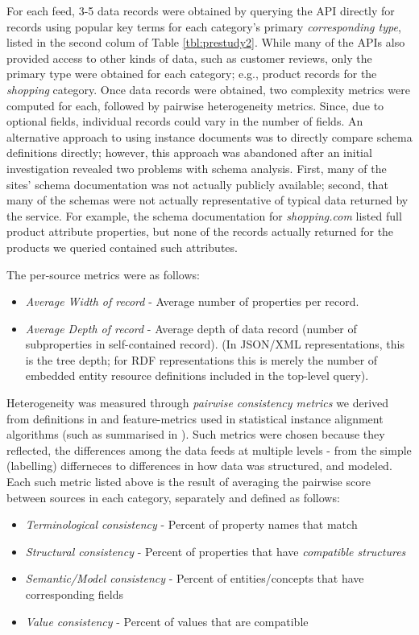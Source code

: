 \documentclass{sigchi}
\begin{document}
For each feed, 3-5 data records were obtained by querying the API directly for records using popular key terms for each category's primary \emph{corresponding type}, listed in the second colum of Table \ref{tbl:prestudy2}. While many of the APIs also provided access to other kinds of data, such as customer reviews, only the primary type were obtained for each category; e.g., product records for the \emph{shopping} category.  Once data records were obtained, two complexity metrics were computed for each, followed by pairwise heterogeneity metrics.  Since, due to optional fields,  individual records could vary in the number of fields.  An alternative approach to using instance documents was to directly compare schema definitions directly; however, this approach was abandoned after an initial investigation revealed two problems with schema analysis.  First, many of the sites' schema documentation was not actually publicly available; second, that many of the schemas were not actually representative of typical data returned by the service. For example, the schema documentation for \emph{shopping.com} listed full product attribute properties, but none of the records actually returned for the products we queried contained such attributes. 

The per-source metrics were as follows:
\begin{itemize}
\item \emph{Average Width of record} - Average number of properties per record.
\item \emph{Average Depth of record} - Average depth of data record (number of subproperties in self-contained record). (In JSON/XML representations, this is the tree depth; for RDF  representations this is merely the number of embedded entity resource definitions included in the top-level query).
\end{itemize}

Heterogeneity was measured through \emph{pairwise consistency metrics} we derived from definitions in \cite{george2005understanding} and feature-metrics used in statistical instance alignment algorithms (such as summarised in \cite{bhattacharya2007collective}). Such metrics were chosen because they reflected, the differences among the data feeds at multiple levels - from the simple (labelling) differneces to differences in how data was structured, and modeled. Each such metric listed above is the result of averaging the pairwise score between sources in each category, separately and defined as follows:

\begin{itemize}
\item \emph{Terminological consistency} - Percent of property names that match
\item \emph{Structural consistency} - Percent of properties that have \emph{compatible structures}
\item \emph{Semantic/Model consistency} - Percent of entities/concepts that have corresponding fields 
\item \emph{Value consistency} - Percent of values that are compatible
\end{itemize}
\end{document}

